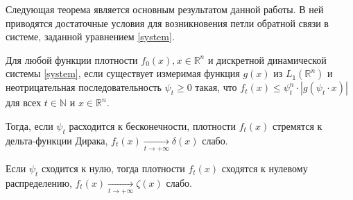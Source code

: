         Следующая теорема является основным результатом данной работы. В ней приводятся достаточные условия для возникновения петли обратной связи в системе, заданной уравнением \eqref{system}.

        \begin{theorem} \label{delta}
        Для любой функции плотности $f_0(x), x \in \mathbb{R}^n$ и дискретной динамической системы \eqref{system}, если существует измеримая функция $g(x)$ из $L_1\left(\mathbb{R}^n\right)$ и неотрицательная последовательность $\psi_t \geq 0$ такая, что $f_t\left(x\right) \leq \psi_t^n \cdot |g(\psi_t \cdot x)|$ для всех $t \in \mathbb{N}$ и $x \in \mathbb{R}^n$.

        Тогда, если $\psi_t$ расходится к бесконечности, плотности $f_t(x)$ стремятся к дельта-функции Дирака, $f_t(x) \underset{t \to +\infty}{\longrightarrow} \delta(x)$ слабо.  

        Если $\psi_t$ сходится к нулю, тогда плотности $f_t(x)$ сходятся к нулевому распределению, $f_t(x) \underset{t \to +\infty}{\longrightarrow} \zeta(x)$ слабо.
    \end{theorem}

